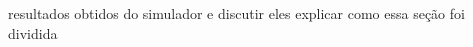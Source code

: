 




resultados obtidos do simulador e discutir eles
explicar como essa seção foi dividida

% 





\newpage





\newpage
%

